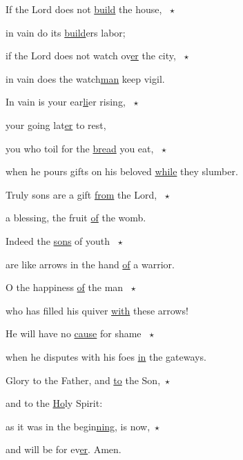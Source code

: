 \noindent If the Lord does not \uline{build} the house, ~$\star$~\nopagebreak

in vain do its \uline{build}ers labor;

\noindent if the Lord does not watch ov\uline{er} the city, ~$\star$~\nopagebreak

in vain does the watch\uline{man} keep vigil.

\noindent In vain is your ear\uline{li}er rising, ~$\star$~\nopagebreak

your going lat\uline{er} to rest,

\noindent you who toil for the \uline{bread} you eat, ~$\star$~\nopagebreak

when he pours gifts on his beloved \uline{while} they slumber.

\noindent Truly sons are a gift \uline{from} the Lord, ~$\star$~\nopagebreak

a blessing, the fruit \uline{of} the womb.

\noindent Indeed the \uline{sons} of youth ~$\star$~\nopagebreak

are like arrows in the hand \uline{of} a warrior.

\noindent O the happiness \uline{of} the man ~$\star$~\nopagebreak

who has filled his quiver \uline{with} these arrows!

\noindent He will have no \uline{cause} for shame ~$\star$~\nopagebreak

when he disputes with his foes \uline{in} the gateways.

\noindent Glory to the Father, and \uline{to} the Son,~$\star$~\nopagebreak

and to the \uline{Ho}ly Spirit:

\noindent as it was in the begin\uline{ning}, is now,~$\star$~\nopagebreak

and will be for ev\uline{er}. Amen.

